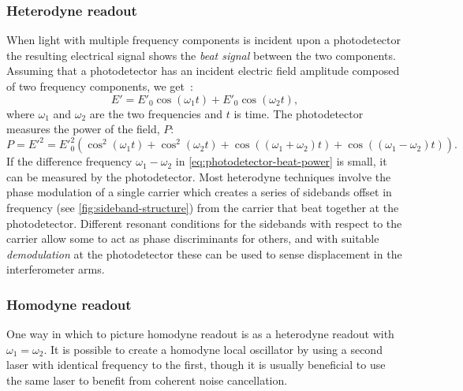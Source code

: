 \subsubsection{Heterodyne readout}
When light with multiple frequency components is incident upon a photodetector the resulting electrical signal shows the \emph{beat signal} between the two components. Assuming that a photodetector has an incident electric field amplitude composed of two frequency components, we get~\cite{Freise2010}:
\begin{equation}
  E' = E'_0 \cos \left( \omega_1 t \right) + E'_0 \cos \left( \omega_2 t \right),
\end{equation}
where $\omega_1$ and $\omega_2$ are the two frequencies and $t$ is time. The photodetector measures the power of the field, $P$:
\begin{equation}
  \label{eq:photodetector-beat-power}
  P = {E'}^2 = {E'}_0^2 \left( \cos^2 \left( \omega_1 t \right) + \cos^2 \left( \omega_2 t \right) + \cos \left( \left( \omega_1 + \omega_2 \right) t \right) + \cos \left( \left( \omega_1 - \omega_2 \right) t \right) \right).
\end{equation}
If the difference frequency $\omega_1 - \omega_2$ in \cref{eq:photodetector-beat-power} is small, it can be measured by the photodetector. Most heterodyne techniques involve the phase modulation of a single carrier which creates a series of sidebands offset in frequency (see \cref{fig:sideband-structure}) from the carrier that beat together at the photodetector. Different resonant conditions for the sidebands with respect to the carrier allow some to act as phase discriminants for others, and with suitable \emph{demodulation} at the photodetector these can be used to sense displacement in the interferometer arms.

\subsubsection{\label{sec:homodyne-readout}Homodyne readout}
One way in which to picture homodyne readout is as a heterodyne readout with $\omega_1 = \omega_2$. It is possible to create a homodyne local oscillator by using a second laser with identical frequency to the first, though it is usually beneficial to use the same laser to benefit from coherent noise cancellation.

